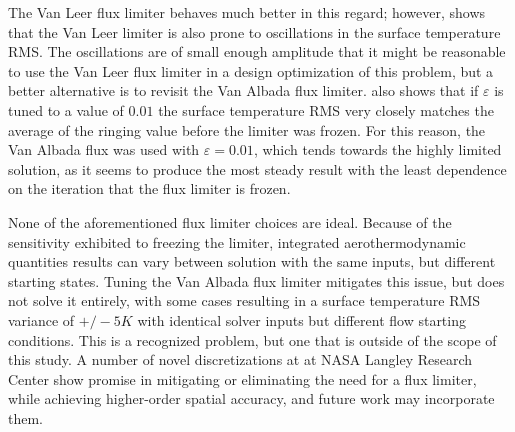 The Van Leer flux limiter behaves much better in this regard; however,
 shows that the Van Leer limiter is also prone to
oscillations in the surface temperature RMS.  The oscillations are of small
enough amplitude that it might be reasonable to use the Van Leer flux limiter in
a design optimization of this problem, but a better alternative is to revisit
the Van Albada flux limiter.   also shows that if
$\varepsilon$ is tuned to a value of $0.01$ the surface temperature RMS very
closely matches the average of the ringing value before the limiter was frozen.
For this reason, the Van Albada flux was used with $\varepsilon = 0.01$, which
tends towards the highly limited solution, as it seems to produce the most
steady result with the least dependence on the iteration that the flux limiter
is frozen.

None of the aforementioned flux limiter choices are ideal.  Because of the
sensitivity exhibited to freezing the limiter, integrated aerothermodynamic
quantities results can vary between solution with the same inputs, but different
starting states.  Tuning the Van Albada flux limiter mitigates this issue, but
does not solve it entirely, with some cases resulting in a surface temperature
RMS variance of $+/- 5 K$ with identical solver inputs but different flow
starting conditions. This is a recognized problem, but one that is outside of
the scope of this study.  A number of novel discretizations at at NASA Langley
Research Center\cite{gnoffo2014global,mazaheri2014very,mazaheri2016high} show
promise in mitigating or eliminating the need for a flux limiter, while
achieving higher-order spatial accuracy, and future work may incorporate them.
